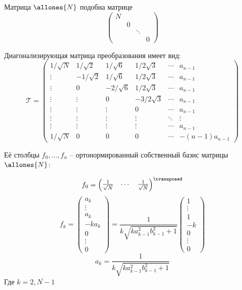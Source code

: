 \begin{propose}
    Матрица \( \allones{N} \) подобна матрице
    \[\begin{pmatrix}
        N &   &        & \\
        & 0 &        & \\
        &   & \ddots & \\
        &   &        & 0
    \end{pmatrix}\]

    Диагонализирующая матрица преобразования имеет вид:
    \begin{equation}\label{eq:diagtransform}
    \mathcal T =
    \begin{pmatrix}
        1/\sqrt N &  1/\sqrt2 & 1/\sqrt6  & 1/2\sqrt3  & \cdots & a_{n-1} \\
        \vdots    & -1/\sqrt2 & 1/\sqrt6  & 1/2\sqrt3  & \cdots & a_{n-1} \\
        \vdots    & 0         & -2/\sqrt6 & 1/2\sqrt3  & \cdots & a_{n-1} \\
        \vdots    & \vdots    & 0         & -3/2\sqrt3 & \cdots & a_{n-1} \\
        \vdots    & \vdots    & \vdots    & 0          & \cdots & a_{n-1} \\
        \vdots    & \vdots    & \vdots    & \vdots     & \ddots & \vdots  \\
        \vdots    & \vdots    & \vdots    & \vdots     & \cdots & a_{n-1} \\
        1/\sqrt N & 0         & 0         & 0          & \cdots & -(n-1)a_{n-1}
        \end{pmatrix}
        \end{equation}

    Её столбцы \( f_0, \ldots, f_n \) -- ортонормированный собственный базис матрицы \( \allones{N} \):

    \[f_0 = \begin{pmatrix} \frac{1}{\sqrt N} & \cdots & \frac{1}{\sqrt N} \end{pmatrix}^\transposed\]
    \providecommand{\fknorm}{\sqrt{k a_{k-1}^2 b_{k-1}^2 + 1}}
    \[
        f_k =
        \begin{pmatrix}a_k \\ \vdots \\ a_k \\ -ka_k \\ 0 \\ \vdots \\ 0 \end{pmatrix} =
        \frac{1}{k\fknorm}
        \begin{pmatrix}1 \\ \vdots \\ 1 \\ -k \\ 0 \\ \vdots \\ 0 \end{pmatrix}
        \]
    \[
         a_k = \frac{1}{k\fknorm}
         \]
         Где \( k=\overline{2,N-1} \)


\end{propose}
